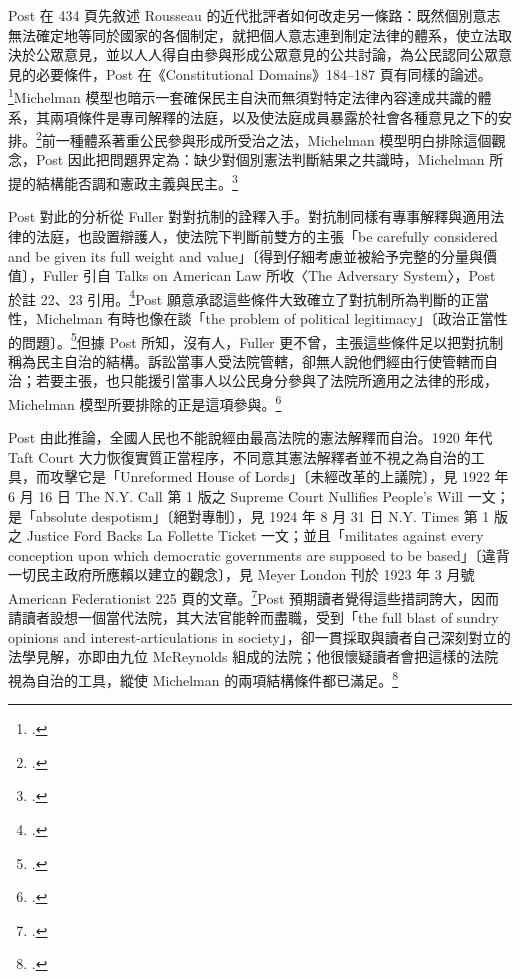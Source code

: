 Post 在 434 頁先敘述 Rousseau 的近代批評者如何改走另一條路：既然個別意志無法確定地等同於國家的各個制定，就把個人意志連到制定法律的體系，使立法取決於公眾意見，並以人人得自由參與形成公眾意見的公共討論，為公民認同公眾意見的必要條件，Post 在《Constitutional Domains》184--187 頁有同樣的論述。\footcite[434 \& n.20]{post1998}Michelman 模型也暗示一套確保民主自決而無須對特定法律內容達成共識的體系，其兩項條件是專司解釋的法庭，以及使法庭成員暴露於社會各種意見之下的安排。\footcite[434 \& n.21]{post1998}前一種體系著重公民參與形成所受治之法，Michelman 模型明白排除這個觀念，Post 因此把問題界定為：缺少對個別憲法判斷結果之共識時，Michelman 所提的結構能否調和憲政主義與民主。\footcite[434]{post1998}

Post 對此的分析從 Fuller 對對抗制的詮釋入手。對抗制同樣有專事解釋與適用法律的法庭，也設置辯護人，使法院下判斷前雙方的主張「be carefully considered and be given its full weight and value」〔得到仔細考慮並被給予完整的分量與價值〕，Fuller 引自 Talks on American Law 所收〈The Adversary System〉，Post 於註 22、23 引用。\footcite[434--435 \& nn.22--23]{post1998}Post 願意承認這些條件大致確立了對抗制所為判斷的正當性，Michelman 有時也像在談「the problem of political legitimacy」〔政治正當性的問題〕。\footcite[435 \& n.24]{post1998}但據 Post 所知，沒有人，Fuller 更不曾，主張這些條件足以把對抗制稱為民主自治的結構。訴訟當事人受法院管轄，卻無人說他們經由行使管轄而自治；若要主張，也只能援引當事人以公民身分參與了法院所適用之法律的形成，Michelman 模型所要排除的正是這項參與。\footcite[435]{post1998}

Post 由此推論，全國人民也不能說經由最高法院的憲法解釋而自治。1920 年代 Taft Court 大力恢復實質正當程序，不同意其憲法解釋者並不視之為自治的工具，而攻擊它是「Unreformed House of Lords」〔未經改革的上議院〕，見 1922 年 6 月 16 日 The N.Y. Call 第 1 版之 Supreme Court Nullifies People's Will 一文；是「absolute despotism」〔絕對專制〕，見 1924 年 8 月 31 日 N.Y. Times 第 1 版之 Justice Ford Backs La Follette Ticket 一文；並且「militates against every conception upon which democratic governments are supposed to be based」〔違背一切民主政府所應賴以建立的觀念〕，見 Meyer London 刊於 1923 年 3 月號 American Federationist 225 頁的文章。\footcite[435 \& nn.25--27]{post1998}Post 預期讀者覺得這些措詞誇大，因而請讀者設想一個當代法院，其大法官能幹而盡職，受到「the full blast of sundry opinions and interest-articulations in society」，卻一貫採取與讀者自己深刻對立的法學見解，亦即由九位 McReynolds 組成的法院；他很懷疑讀者會把這樣的法院視為自治的工具，縱使 Michelman 的兩項結構條件都已滿足。\footcite[435]{post1998}

